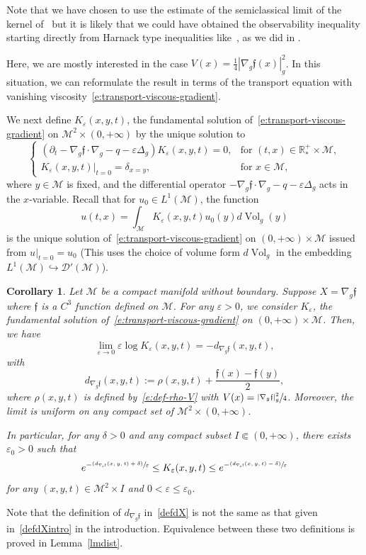 \documentclass[11pt]{article}
\numberwithin{equation}{section}
\newcommand{\psfrac}[2]{\sfrac{(#1)}{#2}}
\newtheorem{corollary}[lemma]{Corollary}
\theoremstyle{definition}
\newcommand{\M}{\ensuremath{\mathcal M}}
\newcommand{\mb}[1]{\ensuremath{\mathbb{#1}}}
\newcommand{\R}{{\mb{R}}}
\newcommand{\f}{\ensuremath{\mathfrak{f}}}
\DeclareMathOperator{\Vol}{Vol}
\newcommand\nablag{\nabla_{g}}
\let\d\partial
\let\e\varepsilon
\let\eps\varepsilon
\let\q q
\begin{document}
Note that we have chosen to use the estimate of the semiclassical limit of the kernel of~\cite{LY86} but it is likely that we could have obtained the observability inequality starting directly from Harnack type inequalities like~\cite[Th.\,2.1]{LY86}, as we did in \cite{LL:18}.

Here, we are mostly interested in the case $V(x) = \frac14 |\nabla_g \f(x)|_g^2$. In this situation, we can reformulate the result in terms of the transport equation with vanishing viscosity~\eqref{e:transport-viscous-gradient}.

We next define $K_{\e}(x,y,t)$, the fundamental solution of~\eqref{e:transport-viscous-gradient} on $\M^2\times(0,+\infty)$ by the unique solution to
\begin{equation}
\label{e:transport-viscous-kernel}
\begin{cases}
(\d_t - \nablag \f \cdot \nablag -\q - \eps \Delta_g ) K_{\e}(x,y,t)= 0, & \text{for } (t,x) \in \R^+_*\times \M, \\
K_{\e}(x,y,t) |_{t=0} = \delta_{x=y}, & \text{for } x \in \M,
\end{cases}
\end{equation}
where $y \in \M$ is fixed, and the differential operator $- \nablag \f \cdot \nablag -\q - \eps \Delta_g$ acts in the $x$-variable.
Recall that for $u_0 \in L^1(\M)$, the function
\[
u(t,x) = \int_\M K_\eps(x,y,t)u_0(y) d\Vol_g(y)
\]
is the unique solution of~\eqref{e:transport-viscous-gradient} on $(0,+\infty)\times \M$ issued from $u|_{t=0} = u_0$ (This uses the choice of volume form $d\Vol_g$ in the embedding $L^1(\M) \hookrightarrow \mathcal{D}'(\M)$).

\begin{corollary}
\label{corLiYauconj}
Let $\M$ be a compact manifold without boundary. Suppose \hbox{$X\!=\!\nabla_g \f$} where $\f$ is a $C^3$ function defined on $\M$. For any $\e>0$, we consider $K_{\e}$, the fundamental solution of~\eqref{e:transport-viscous-gradient} on $(0,+\infty)\times \M$. Then, we have
\[
\underset{\e\to 0}{\lim}\e \log K_{\e}(x,y, t)=-d_{\nablag \f}(x,y,t),
\]
with
\begin{equation}
\label{defdX}
d_{\nablag \f}(x,y,t) := \rho(x,y,t)+ \frac{\f(x)-\f(y)}{2},
\end{equation}
where $\rho(x,y,t)$ is defined by~\eqref{e:def-rho-V} with $V(x) = \sfrac{|\nabla_g \f|_g^2}{4}$.
Moreover, the limit is uniform on any compact set of $\M^2 \times (0,+\infty)$.

In particular, for any $\delta>0$ and any compact subset $I \Subset (0,+\infty)$, there exists $\e_0>0$ such that
\begin{equation}
\label{inegkernel}
e^{-\psfrac{d_{\nablag \f}(x,y,t)+\delta}{\e}}\leq K_{\e}(x,y,t)\leq e^{-\psfrac{d_{\nablag \f}(x,y,t)-\delta}{\e}}
\end{equation}
for any $(x,y,t)\in \M^2 \times I$ and $0<\e\leq \e_0$.
\end{corollary}
Note that the definition of $d_{\nablag \f}$ in~\eqref{defdX} is not the same as that given in~\eqref{defdXintro} in the introduction. Equivalence between these two definitions is proved in Lemma~\ref{lmdist}.
\end{document}
